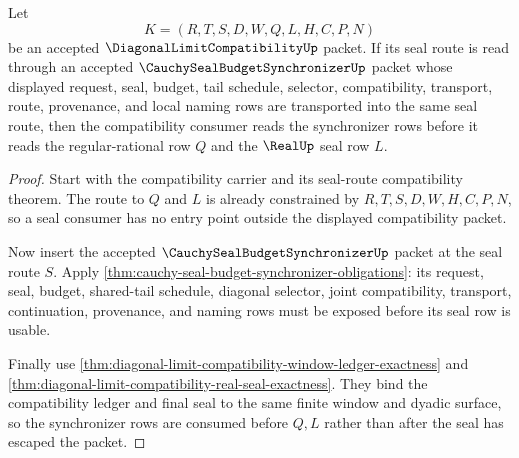 \begin{theorem}
\label{thm:diagonal-limit-compatibility-seal-budget-synchronizer-handoff}
Let
$$
K=(R,T,S,D,W,Q,L,H,C,P,N)
$$
be an accepted $\DiagonalLimitCompatibilityUp$ packet. If its seal route is read through an accepted $\CauchySealBudgetSynchronizerUp$ packet whose displayed request, seal, budget, tail schedule, selector, compatibility, transport, route, provenance, and local naming rows are transported into the same seal route, then the compatibility consumer reads the synchronizer rows before it reads the regular-rational row $Q$ and the $\RealUp$ seal row $L$.
\end{theorem}
\begin{proof}
Start with the compatibility carrier and its seal-route compatibility theorem. The route to $Q$ and $L$ is already constrained by $R,T,S,D,W,H,C,P,N$, so a seal consumer has no entry point outside the displayed compatibility packet.

Now insert the accepted $\CauchySealBudgetSynchronizerUp$ packet at the seal route $S$. Apply \autoref{thm:cauchy-seal-budget-synchronizer-obligations}: its request, seal, budget, shared-tail schedule, diagonal selector, joint compatibility, transport, continuation, provenance, and naming rows must be exposed before its seal row is usable.

Finally use \autoref{thm:diagonal-limit-compatibility-window-ledger-exactness} and \autoref{thm:diagonal-limit-compatibility-real-seal-exactness}. They bind the compatibility ledger and final seal to the same finite window and dyadic surface, so the synchronizer rows are consumed before $Q,L$ rather than after the seal has escaped the packet.
\end{proof}

